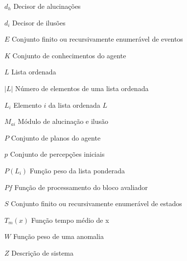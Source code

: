 \begin{simbolos}
  \item[$ d_{h} $] Decisor de alucinações
  \item[$ d_{i} $] Decisor de ilusões
  \item[$ E $] Conjunto finito ou recursivamente enumerável de eventos
  \item[$ K $] Conjunto de conhecimentos do agente
  \item[$ L $] Lista ordenada
  \item[$ |L| $] Número de elementos de uma lista ordenada
  \item[$ L_i $] Elemento $i$ da lista ordenada $L$
  \item[$ M_{ai} $] Módulo de alucinação e ilusão
  \item[$ P $] Conjunto de planos do agente
  \item[$ p $] Conjunto de percepções iniciais
  \item[$ P(L_i) $] Função peso da lista ponderada
  \item[$ Pf $] Função de processamento do bloco avaliador
  \item[$ S $] Conjunto finito ou recursivamente enumerável de estados
  \item[$ T_{m}(x) $] Função tempo médio de x
  \item[$ W $] Função peso de uma anomalia
  \item[$ Z $] Descrição de sistema
\end{simbolos}

